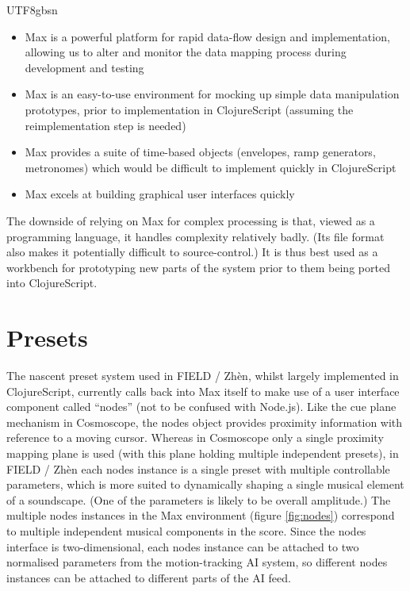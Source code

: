 \documentclass[manuscript,review,anonymous,natbib=false]{acmart}
\newcommand{\fz}{FIELD / Zh\`{e}n}
\begin{document}
\begin{CJK*}{UTF8}{gbsn}
  \begin{itemize}

  \item Max is a powerful platform for rapid data-flow design and implementation, allowing us to alter and monitor the data mapping process during development and testing

  \item Max is an easy-to-use environment for mocking up simple data manipulation prototypes, prior to implementation in ClojureScript (assuming the reimplementation step is needed)

  \item Max provides a suite of time-based objects (envelopes, ramp generators, metronomes) which would be difficult to implement quickly in ClojureScript

  \item Max excels at building graphical user interfaces quickly

  \end{itemize}

  \noindent The downside of relying on Max for complex processing is that, viewed as a programming language, it handles complexity relatively badly. (Its file format also makes it potentially difficult to source-control.) It is thus best used as a workbench for prototyping new parts of the system prior to them being ported into ClojureScript.

  \section{Presets}

  The nascent preset system used in \fz{}, whilst largely implemented in ClojureScript, currently calls back into Max itself to make use of a user interface component called ``nodes''\cite{noauthor_nodes_nodate} (not to be confused with Node.js). Like the cue plane mechanism in Cosmoscope, the nodes object provides proximity information with reference to a moving cursor. Whereas in Cosmoscope only a single proximity mapping plane is used (with this plane holding multiple independent presets), in \fz{} each nodes instance is a single preset with multiple controllable parameters, which is more suited to dynamically shaping a single musical element of a soundscape. (One of the parameters is likely to be overall amplitude.) The multiple nodes instances in the Max environment (figure \ref{fig:nodes}) correspond to multiple independent musical components in the score. Since the nodes interface is two-dimensional, each nodes instance can be attached to two normalised parameters from the motion-tracking AI system, so different nodes instances can be attached to different parts of the AI feed.


\end{CJK*}
\end{document}
